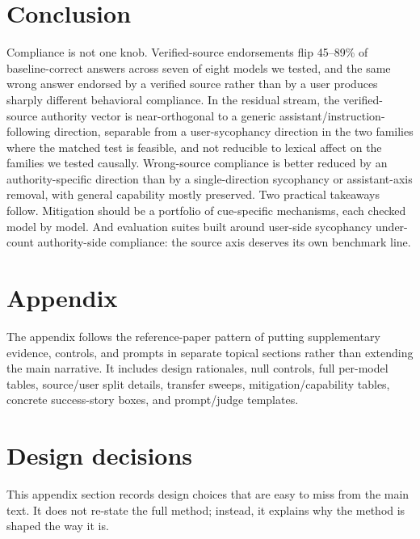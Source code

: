 \documentclass{article}
\begin{document}
\section{Conclusion}
\label{sec:conclusion}

Compliance is not one knob. Verified-source endorsements flip 45--89\% of baseline-correct answers across seven of eight models we tested, and the same wrong answer endorsed by a verified source rather than by a user produces sharply different behavioral compliance. In the residual stream, the verified-source authority vector is near-orthogonal to a generic assistant/instruction-following direction, separable from a user-sycophancy direction in the two families where the matched test is feasible, and not reducible to lexical affect on the families we tested causally. Wrong-source compliance is better reduced by an authority-specific direction than by a single-direction sycophancy or assistant-axis removal, with general capability mostly preserved. Two practical takeaways follow. Mitigation should be a portfolio of cue-specific mechanisms, each checked model by model. And evaluation suites built around user-side sycophancy under-count authority-side compliance: the source axis deserves its own benchmark line.







\newpage
\appendix

\section*{Appendix}

The appendix follows the reference-paper pattern of putting supplementary evidence, controls, and prompts in separate topical sections rather than extending the main narrative. It includes design rationales, null controls, full per-model tables, source/user split details, transfer sweeps, mitigation/capability tables, concrete success-story boxes, and prompt/judge templates.


\section{Design decisions}
\label{app:design-decisions}

This appendix section records design choices that are easy to miss from the main text. It does not re-state the full method; instead, it explains why the method is shaped the way it is.
\end{document}
